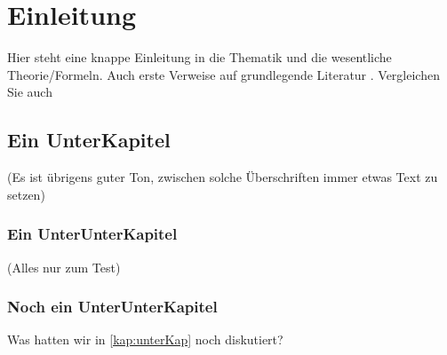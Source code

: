 \section{Einleitung}
Hier steht eine knappe Einleitung in die Thematik und die wesentliche
Theorie/Formeln. Auch erste Verweise auf grundlegende Literatur
\cite{SternGerlach}.
Vergleichen Sie auch \cite{wissarbeit}

\subsection{Ein UnterKapitel} \label{kap:unterKap}
(Es ist \"ubrigens guter Ton, zwischen solche \"Uberschriften immer etwas Text
zu setzen)
\subsubsection{Ein UnterUnterKapitel}
(Alles nur zum Test)
\subsubsection{Noch ein UnterUnterKapitel }
\label{kap:unterunterKap}

Was hatten wir in \autoref{kap:unterKap} noch diskutiert?